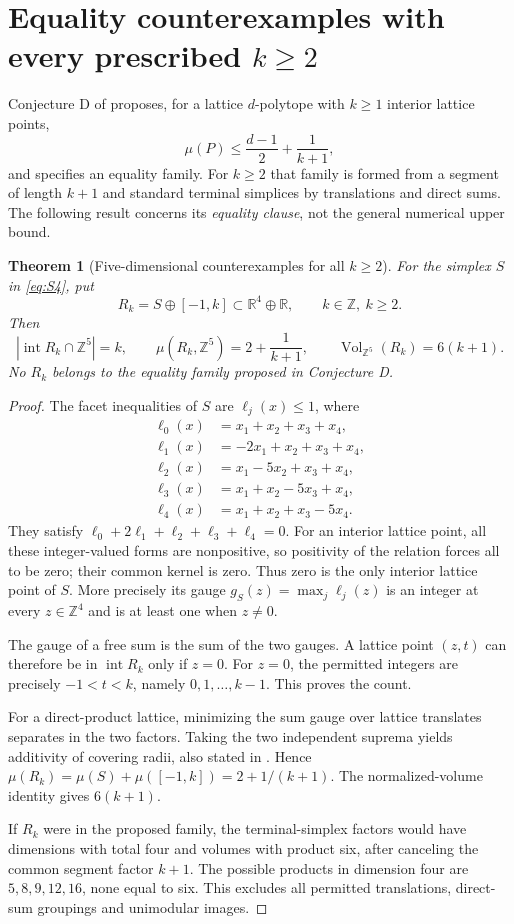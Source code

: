 \documentclass[11pt,a4paper]{article}
\newtheorem{theorem}{Theorem}[section]
\theoremstyle{remark}\newtheorem{remark}[theorem]{Remark}
\DeclareMathOperator{\Vol}{Vol}
\DeclareMathOperator{\inter}{int}
\newcommand{\R}{\mathbb R}\newcommand{\Z}{\mathbb Z}
\begin{document}
\section{Equality counterexamples with every prescribed \texorpdfstring{$k\ge2$}{k >= 2}}
Conjecture D of \cite{CSS} proposes, for a lattice $d$-polytope with
$k\ge1$ interior lattice points,
\[
 \mu(P)\le\frac{d-1}{2}+\frac1{k+1},
\]
and specifies an equality family. For $k\ge2$ that family is formed
from a segment of length $k+1$ and standard terminal simplices by
translations and direct sums. The following result concerns its
\emph{equality clause}, not the general numerical upper bound.

\begin{theorem}[Five-dimensional counterexamples for all $k\ge2$]
\label{thm:D}
For the simplex $S$ in \eqref{eq:S4}, put
\[
 R_k=S\oplus[-1,k]\subset\R^4\oplus\R,\qquad k\in\Z,\ k\ge2.
\]
Then
\[
 |\inter R_k\cap\Z^5|=k,\qquad
 \mu(R_k,\Z^5)=2+\frac1{k+1},\qquad
 \Vol_{\Z^5}(R_k)=6(k+1).
\]
No $R_k$ belongs to the equality family proposed in Conjecture D.
\end{theorem}
\begin{proof}
The facet inequalities of $S$ are $\ell_j(x)\le1$, where
\begin{align*}
 \ell_0(x)&=x_1+x_2+x_3+x_4,\\
 \ell_1(x)&=-2x_1+x_2+x_3+x_4,\\
 \ell_2(x)&=x_1-5x_2+x_3+x_4,\\
 \ell_3(x)&=x_1+x_2-5x_3+x_4,\\
 \ell_4(x)&=x_1+x_2+x_3-5x_4.
\end{align*}
They satisfy $\ell_0+2\ell_1+\ell_2+\ell_3+\ell_4=0$.
For an interior lattice point, all these integer-valued forms are
nonpositive, so positivity of the relation forces all to be zero;
their common kernel is zero. Thus zero is the only interior lattice
point of $S$. More precisely its gauge
$g_S(z)=\max_j\ell_j(z)$ is an integer at every $z\in\Z^4$ and
is at least one when $z\ne0$.

The gauge of a free sum is the sum of the two gauges. A lattice point
$(z,t)$ can therefore be in $\inter R_k$ only if $z=0$. For $z=0$,
the permitted integers are precisely $-1<t<k$, namely
$0,1,\ldots,k-1$. This proves the count.

For a direct-product lattice, minimizing the sum gauge over lattice
translates separates in the two factors. Taking the two independent
suprema yields additivity of covering radii, also stated in
\cite[Corollary 2.2]{CSS}. Hence
$\mu(R_k)=\mu(S)+\mu([-1,k])=2+1/(k+1)$.
The normalized-volume identity gives $6(k+1)$.

If $R_k$ were in the proposed family, the terminal-simplex factors
would have dimensions with total four and volumes with product six,
after canceling the common segment factor $k+1$. The possible
products in dimension four are $5,8,9,12,16$, none equal to six.
This excludes all permitted translations, direct-sum groupings and
unimodular images.
\end{proof}
\end{document}
